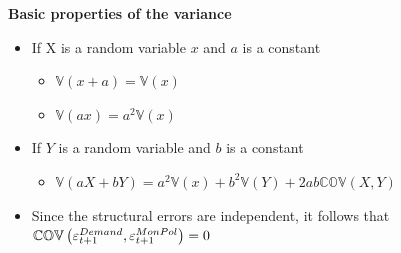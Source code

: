 \begin{frame}
{\textbf{Basic properties of the variance \ {} }}\bigskip \bigskip 

\begin{itemize}
\item If X is a random variable $x$ and $a$ is a constant

\begin{itemize}
\item $\mathbb{V}\left( x+a\right) =\mathbb{V}\left( x\right) $

\item $\mathbb{V}\left( ax\right) =a^{2}\mathbb{V}\left( x\right) $\bigskip
\medskip
\end{itemize}

\item If $Y$ is a random variable and $b$ is a constant

\begin{itemize}
\item $\mathbb{V}\left( aX+bY\right) =a^{2}\mathbb{V}\left( x\right) +b^{2}%
\mathbb{V}\left( Y\right) +2ab\mathbb{COV}\left( X,Y\right) $\bigskip
\medskip\ 
\end{itemize}

\item Since the structural errors are independent, it follows that $\mathbb{%
COV}\left( \varepsilon _{t+1}^{Demand},\varepsilon _{t+1}^{MonPol}\right) =0$
\end{itemize}
\end{frame}


